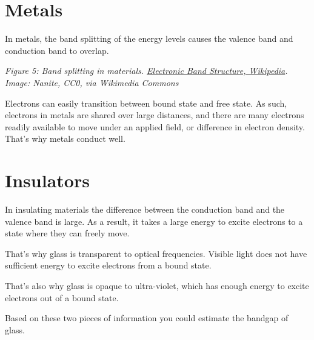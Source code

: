 \section{Metals}\label{metals}

In metals, the band splitting of the energy levels causes the valence
band and conduction band to overlap.


{
\centering
{}
}

\emph{Figure 5: Band splitting in materials.
\href{https://en.wikipedia.org/wiki/Electronic_band_structure}{Electronic
Band Structure, Wikipedia}. Image: Nanite, CC0, via Wikimedia Commons}

Electrons can easily transition between bound state and free state. As
such, electrons in metals are shared over large distances, and there are
many electrons readily available to move under an applied field, or
difference in electron density. That's why metals conduct well.

\section{Insulators}\label{insulators}

In insulating materials the difference between the conduction band and
the valence band is large. As a result, it takes a large energy to
excite electrons to a state where they can freely move.

That's why glass is transparent to optical frequencies. Visible light
does not have sufficient energy to excite electrons from a bound state.

That's also why glass is opaque to ultra-violet, which has enough energy
to excite electrons out of a bound state.

Based on these two pieces of information you could estimate the bandgap
of glass.

